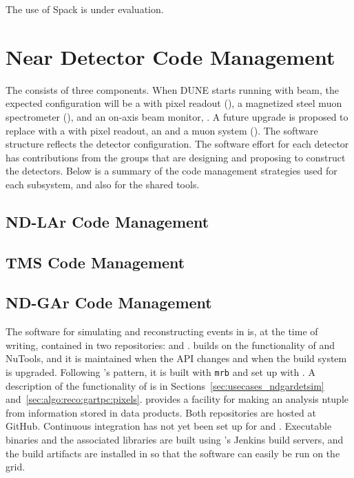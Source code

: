 \documentclass[../main-v1.tex]{subfiles}
\begin{document}
The use of Spack is under evaluation.  %

\section{Near Detector Code Management }
\label{sec:codemgmt:neardet}  %

The  consists of three components.  When DUNE starts running with beam, the expected  configuration will be a  with pixel readout (), a magnetized steel muon spectrometer (), and an on-axis beam monitor, .  A future upgrade is proposed to replace  with a  with pixel readout, an  and a muon system (). The software structure reflects the detector configuration.  The software effort for each detector has contributions from the groups that are designing and proposing to construct the detectors.  Below is a summary of the code management strategies used for each subsystem, and also for the shared tools.

\subsection{ND-LAr Code Management}
\label{sec:codemgmt:ndlar}

\subsection{TMS Code Management}
\label{sec:codemgmt:tms}

\subsection{ND-GAr Code Management}
\label{sec:codemgmt:ndgar}

The software for simulating and reconstructing events in  is, at the time of writing, contained in two repositories:   and .   builds on the functionality of  and NuTools, and it is maintained when the  API changes and when the build system is upgraded.  Following 's pattern, it is built with {\tt mrb} and set up with .   A description of the functionality of  is in Sections~\ref{sec:usecases_ndgardetsim} and~\ref{sec:algo:reco:gartpc:pixels}.   provides a facility for making an analysis ntuple from information stored in  data products.  Both repositories are hosted at GitHub.  Continuous integration has not yet been set up for  and .  Executable binaries and the associated libraries are built using 's Jenkins build servers, and the build artifacts are installed in  so that the software can easily be run on the grid.
\end{document}
